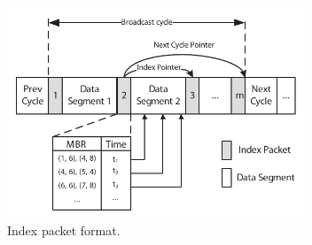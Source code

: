 \documentclass{sig-alternate}
\newtheorem{mydef}{Definition}
\begin{document}



\begin{figure}[h]
\begin{center}
\includegraphics[width=3.5in]{Figures/index_packet.pdf}
\caption{\small Index packet format.
\label{fig:index_packet}}
\end{center}
\end{figure}

\end{document}
